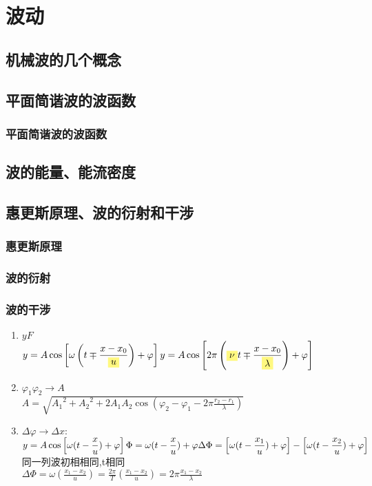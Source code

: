 \documentclass[UTF8,a4paper,12pt,scheme=chinese]{ctexbook}
\newcommand{\hla}[1]{%
	\colorbox{yellow!50}{$\displaystyle#1$}}
\begin{document}
	\chapter{波动}
	\section{机械波的几个概念}
	\section{平面简谐波的波函数}
	\subsection{平面简谐波的波函数}
	\section{波的能量、能流密度}
	\section{惠更斯原理、波的衍射和干涉}
	\subsection{惠更斯原理}
	\subsection{波的衍射}
	\subsection{波的干涉}
	\begin{enumerate}
		\item $yF$\\
		$\displaystyle
		y=A\cos\left[\omega\left(t\mp\frac{x-x_0}{\hla{u}}\right)+\varphi\right]\\
		y=A\cos\left[2\pi\left(\hla{\nu} t\mp\frac{x-x_0}{\hla{\lambda}}\right)+\varphi\right]
		$
		\item $\varphi_1\varphi_2\rightarrow A$\\
		$\displaystyle
		A=\sqrt{{A_1}^2+{A_2}^2+2A_1A_2\cos\left(\varphi_2-\varphi_1-2\pi\frac{r_2-r_1}{\lambda}\right)}$
		\item $\Delta \varphi \rightarrow \Delta x:$\\
		$\displaystyle
		y=A\cos \left[\omega(t-\frac{x}{u})+\varphi\right]\\
		\Phi = \omega(t-\frac{x}{u})+\varphi\\
		\Delta \Phi = \left[\omega(t-\frac{x_1}{u})+\varphi\right] - \left[\omega(t-\frac{x_2}{u})+\varphi\right]
		$\\
		同一列波初相相同,t相同\\
		$\displaystyle
		\Delta \Phi = \omega\left(\frac{x_1-x_2}{u}\right) = \frac{2\pi}{T}\left(\frac{x_1-x_2}{u}\right) = 2\pi\frac{x_1-x_2}{\lambda}
		$
	\end{enumerate}
\end{document}
